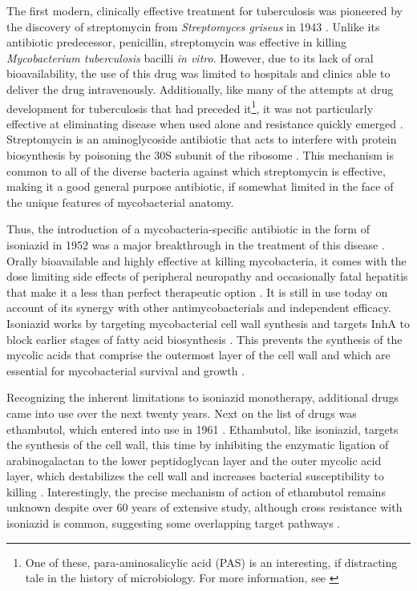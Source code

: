 The first modern, clinically effective treatment for tuberculosis was pioneered by the discovery of streptomycin from \textit{Streptomyces griseus} in 1943 \citep{Comroe1978, Hinshaw1946, Hinshaw1947}. Unlike its antibiotic predecessor, penicillin, streptomycin was effective in killing \textit{Mycobacterium tuberculosis} bacilli \textit{in vitro}. However, due to its lack of oral bioavailability, the use of this drug was limited to hospitals and clinics able to deliver the drug intravenously. Additionally, like many of the attempts at drug development for tuberculosis that had preceded it\footnote{One of these, para\hyp{}aminosalicylic acid (PAS) is an interesting, if distracting tale in the history of microbiology. For more information, see \citep{Donald2015, Dubovsky1988}}, it was not particularly effective at eliminating disease when used alone and resistance quickly emerged \citep{Pfuetze1949, Ruiz2003}. Streptomycin is an aminoglycoside antibiotic that acts to interfere with protein biosynthesis by poisoning the 30S subunit of the ribosome \citep{Sharma2007}. This mechanism is common to all of the diverse bacteria against which streptomycin is effective, making it a good general purpose antibiotic, if somewhat limited in the face of the unique features of mycobacterial anatomy.

Thus, the introduction of a mycobacteria\hyp{}specific antibiotic in the form of isoniazid in 1952 was a major breakthrough in the treatment of this disease \citep{Goldman1972}. Orally bioavailable and highly effective at killing mycobacteria, it comes with the dose limiting side effects of peripheral neuropathy and occasionally fatal hepatitis that make it a less than perfect therapeutic option \citep{Maddrey1973, Black1975, Metushi2011, Metushi2016, Diallo2018}. It is still in use today on account of its synergy with other antimycobacterials and independent efficacy. Isoniazid works by targeting mycobacterial cell wall synthesis and targets InhA to block earlier stages of fatty acid biosynthesis \citep{Timmins2006, Vilcheze2007}. This prevents the synthesis of the mycolic acids that comprise the outermost layer of the cell wall and which are essential for mycobacterial survival and growth \citep{Lei2000, Rozwarski1998, Vilcheze2006, Timmins2006}. 

Recognizing the inherent limitations to isoniazid monotherapy, additional drugs came into use over the next twenty years. Next on the list of drugs was ethambutol, which entered into use in 1961 \citep{Thomas1961, Chakraborty2015}. Ethambutol, like isoniazid, targets the synthesis of the cell wall, this time by inhibiting the enzymatic ligation of arabinogalactan to the lower peptidoglycan layer and the outer mycolic acid layer, which destabilizes the cell wall and increases bacterial susceptibility to killing \citep{Zhang2020a, Safi2013}. Interestingly, the precise mechanism of action of ethambutol remains unknown despite over 60 years of extensive study, although cross resistance with isoniazid is common, suggesting some overlapping target pathways \citep{Zhang2020a, Gupta2006}.

